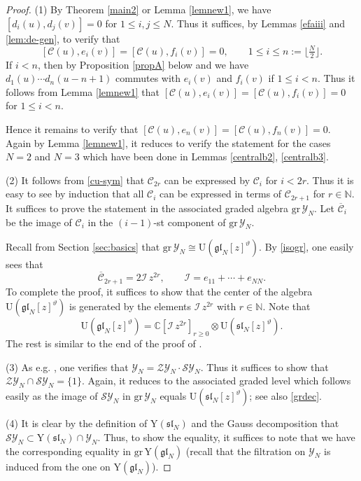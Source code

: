\documentclass[11pt,reqno]{amsart}
\numberwithin{equation}{section}
\theoremstyle{definition}
\theoremstyle{remark}
\newcommand{\beq}{\begin{equation}}
\newcommand{\eeq}{\end{equation}}
\newcommand{\bC}{\mathbb{C}}
\newcommand{\bN}{\mathbb{N}}
\newcommand{\mc}{\mathcal}
\newcommand{\gl}{\mathfrak{gl}}
\newcommand{\rY}{\mathrm{Y}}
\newcommand{\gr}{{\mathrm{gr}}}
\newcommand{\gge}{\geqslant}
\newcommand{\lle}{\leqslant}
\newcommand{\Y}{{\mathscr{Y}}}
\newcommand{\SY}{{\mathscr{SY}}}
\begin{document}
\begin{proof}
(1) By Theorem \ref{main2} or Lemma \ref{lemnew1}, we have $[d_i(u),d_j(v)]=0$ for $1\lle i,j\lle N$. Thus it suffices, by Lemmas \ref{efaiii} and \ref{lem:de-gen}, to verify that 
$$
[\mathcal C(u),e_i(v)]=[\mathcal C(u),f_i(v)]=0,\qquad 1\lle i\lle n:=\lfloor \tfrac{N}{2}\rfloor.
$$ 
If $i<n$, then by Proposition \ref{propA} below and \cite[Thm. 8.6]{BK05} we have $d_1(u)\cdots d_n(u-n+1)$ commutes with $e_i(v)$ and $f_i(v)$ if $1\lle i<n$. Thus it follows from Lemma \ref{lemnew1} that $[\mathcal C(u),e_i(v)]=[\mathcal C(u),f_i(v)]=0$ for $1\lle i<n$. 

Hence it remains to verify that $[\mathcal C(u),e_n(v)]=[\mathcal C(u),f_n(v)]=0$. Again by Lemma \ref{lemnew1}, it reduces to verify the statement for the cases $N=2$ and $N=3$ which have been done in Lemmas \ref{centralb2}, \ref{centralb3}.


(2) It follows from \eqref{cu-sym} that $\mathcal C_{2r}$ can be expressed by $\mathcal C_i$ for $i<2r$. Thus it is easy to see by induction that all $\mathcal C_i$ can be expressed in terms of $\mathcal C_{2r+1}$ for $r\in\bN$. It suffices to prove the statement in the associated graded algebra $\gr\,\Y_N$. Let $\overline{\mc C}_i$ be the image of $\mc C_i$ in the $(i-1)$-st component of $\gr\,\Y_N$.

Recall from Section \ref{sec:basics} that $\gr\,\Y_N\cong \mathrm{U}(\gl_N[z]^\vartheta)$. By \eqref{isogr}, one easily sees that
\[
\overline{\mc C}_{2r+1}=2\mathcal I\,z^{2r},\qquad \mathcal I=e_{11}+\cdots+e_{NN}.
\]
To complete the proof, it suffices to show that the center of the algebra $\mathrm{U}(\gl_N[z]^\vartheta)$ is generated by the elements $\mathcal I\,z^{2r}$ with $r\in\bN$. Note that
\beq\label{grdec}
\mathrm{U}(\gl_N[z]^\vartheta)=\bC[\mathcal I\,z^{2r}]_{r\gge 0}\otimes \mathrm{U}(\mathfrak{sl}_N[z]^\vartheta).
\eeq
The rest is similar to the end of the proof of \cite[Thm. 3.4]{MR02}.

(3) As e.g. \cite[Lem. 3.11]{KLWZ23a}, one verifies that $\Y_N=\mathscr{ZY}_N\cdot \SY_N$. Thus it suffices to show that $\mathscr{ZY}_N\cap\SY_N=\{1\}$. Again, it reduces to the associated graded level which follows easily as the image of $\SY_N$ in $\gr\,\Y_N$ equals $\mathrm{U}(\mathfrak{sl}_N[z]^\vartheta)$; see also \eqref{grdec}.

(4) It is clear by the definition of $\rY(\mathfrak{sl}_N)$ and the Gauss decomposition that $\SY_N\subset \rY(\mathfrak{sl}_N)\cap \Y_N$. Thus, to show the equality, it suffices to note that we have the corresponding equality in $\gr\,\rY(\gl_N)$ (recall that the filtration on $\Y_N$ is induced from the one on $\rY(\gl_N)$).
\end{proof}
\end{document}
